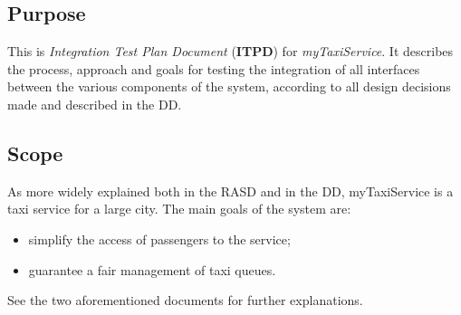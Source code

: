 \subsection{Purpose}
	This is \textit{Integration Test Plan Document} (\textbf{ITPD}) for \textit{myTaxiService}. It describes the process, approach and goals for testing the integration of all interfaces between the various components of the system, according to all design decisions made and described in the DD.

\subsection{Scope}
	As more widely explained both in the RASD and in the DD, myTaxiService
	is a taxi service for a large city. The main goals of the system
	are:
	\begin{itemize}
		\item simplify the access of passengers to the service;
		\item guarantee a fair management of taxi queues.
	\end{itemize}
	See the two aforementioned documents for further explanations.
	
\newpage